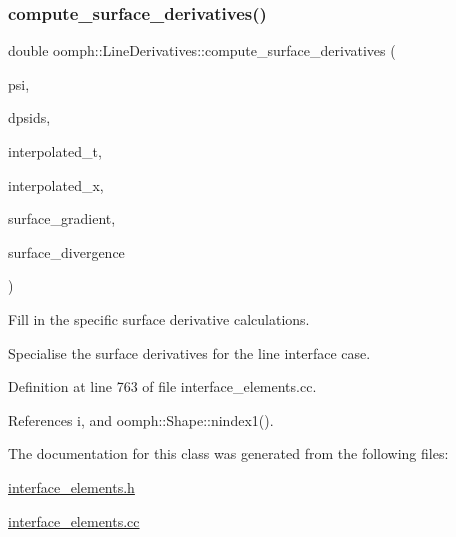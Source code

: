 \subsubsection{\texorpdfstring{compute\+\_\+surface\+\_\+derivatives()}{compute\_surface\_derivatives()}}
{\footnotesize\ttfamily double oomph\+::\+Line\+Derivatives\+::compute\+\_\+surface\+\_\+derivatives (\begin{DoxyParamCaption}\item[{const \hyperlink{classoomph_1_1Shape}{Shape} \&}]{psi,  }\item[{const \hyperlink{classoomph_1_1DShape}{D\+Shape} \&}]{dpsids,  }\item[{const \hyperlink{classoomph_1_1DenseMatrix}{Dense\+Matrix}$<$ double $>$ \&}]{interpolated\+\_\+t,  }\item[{const \hyperlink{classoomph_1_1Vector}{Vector}$<$ double $>$ \&}]{interpolated\+\_\+x,  }\item[{\hyperlink{classoomph_1_1DShape}{D\+Shape} \&}]{surface\+\_\+gradient,  }\item[{\hyperlink{classoomph_1_1DShape}{D\+Shape} \&}]{surface\+\_\+divergence }\end{DoxyParamCaption})\hspace{0.3cm}{\ttfamily [protected]}}



Fill in the specific surface derivative calculations. 

Specialise the surface derivatives for the line interface case. 

Definition at line 763 of file interface\+\_\+elements.\+cc.



References i, and oomph\+::\+Shape\+::nindex1().



The documentation for this class was generated from the following files\+:\begin{DoxyCompactItemize}
\item 
\hyperlink{interface__elements_8h}{interface\+\_\+elements.\+h}\item 
\hyperlink{interface__elements_8cc}{interface\+\_\+elements.\+cc}\end{DoxyCompactItemize}
